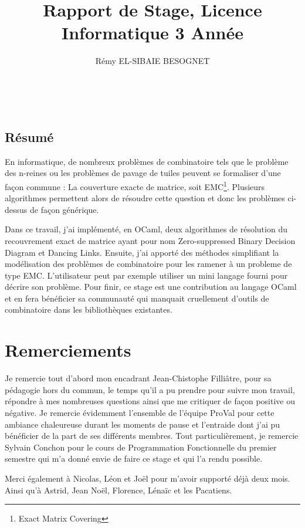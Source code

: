 \documentclass[a4paper]{article}
\title{Rapport de Stage, Licence Informatique 3\up{ème} Année}
\author{Rémy \textsc{EL-SIBAIE BESOGNET}}
\begin{document}


~
\vfill

\begin{center}
\section*{Résumé}
\end{center}
En informatique, de nombreux problèmes de combinatoire tels que le problème des 
n-reines ou les problèmes de pavage de tuiles peuvent se formaliser d'une
façon commune :
La couverture exacte de matrice, soit EMC\footnote{Exact Matrix Covering}. 
Plusieurs algorithmes permettent alors 
de résoudre cette question et donc les problèmes ci-dessus de façon générique.

Dans ce travail, j'ai implémenté, en OCaml, deux algorithmes de
résolution du recouvrement exact de matrice ayant pour nom 
Zero-suppressed Binary Decision
Diagram et Dancing Links. 
Ensuite, j'ai apporté des méthodes 
simplifiant la modélisation des problèmes de combinatoire pour les ramener
à un probleme de type EMC. L'utilisateur peut par 
exemple utiliser un mini langage fourni pour décrire son problème. Pour finir, 
ce stage est une contribution au langage OCaml et 
en fera bénéficier sa communauté qui manquait cruellement d'outils de 
combinatoire dans les bibliothèques existantes.

\vfill




\newpage
\section*{Remerciements}

Je remercie tout d'abord mon encadrant Jean-Chistophe Filliâtre, pour sa 
pédagogie hors du commun, le temps qu'il a pu prendre pour suivre mon 
travail, répondre à mes nombreuses questions ainsi que me critiquer de façon 
positive ou négative.
Je remercie évidemment l'ensemble de l'équipe ProVal pour cette ambiance 
chaleureuse durant les moments de pause et l'entraide dont j'ai pu 
bénéficier de la part de ses différents membres. Tout particulièrement, je 
remercie Sylvain Conchon pour le cours de Programmation Fonctionnelle du
premier semestre qui m'a donné envie de faire ce stage et qui l'a rendu 
possible.

Merci également à Nicolas, Léon et Joël pour m'avoir supporté déjà deux mois. 
Ainsi qu'à Astrid, Jean Noël, Florence, Lénaïc et les Pacatiens.
\end{document}
